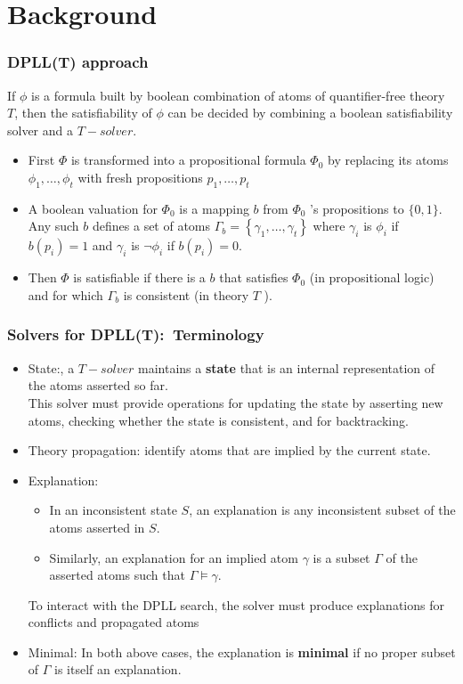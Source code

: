 \documentclass[aspectratio=169%
,serif,mathserif]{beamer}
\begin{document}
\section{Background}
\begin{frame}
	\frametitle{DPLL(T) approach}
	If $\phi$ is a formula built by boolean combination of atoms of quantifier-free theory $T$, then the
	satisfiability of $\phi$ can be decided by combining a boolean satisfiability solver and a $T-solver$.
	\begin{itemize}
		\item First $\Phi$ is transformed into a propositional formula $\Phi_{0}$ by replacing its atoms $\phi_{1}, \ldots, \phi_{t}$ with fresh propositions $p_{1}, \ldots, p_{t}$
		\item A boolean valuation for $\Phi_{0}$ is a mapping $b$ from $\Phi_{0}$ 's propositions to $\{0,1\}$. Any such $b$ defines a set of atoms $\Gamma_{b}=\left\{\gamma_{1}, \ldots, \gamma_{t}\right\}$ where $\gamma_{i}$ is $\phi_{i}$ if $b\left(p_{i}\right)=1$ and $\gamma_{i}$ is $\neg \phi_{i}$ if $b\left(p_{i}\right)=0$. 
		\item Then $\Phi$ is satisfiable if there is a $b$ that satisfies $\Phi_{0}$ (in propositional logic) and for which $\Gamma_{b}$ is consistent (in theory $T$ ).
	\end{itemize}
\end{frame}

\begin{frame}
	\frametitle{Solvers for DPLL(T):~Terminology}
	\begin{itemize}
		\item State:, a $T-solver$ maintains a \textbf{state} that is an internal representation of the
		atoms asserted so far. \\
		      This solver must provide operations for updating the state by asserting new
		atoms, checking whether the state is consistent, and for backtracking.
		\item Theory propagation: identify atoms that are implied by the current state.
		\item Explanation:
			\begin{itemize}
				\item In an inconsistent state $S$, an explanation is any inconsistent subset of the atoms asserted in $S$.
				\item Similarly, an explanation for an implied atom $\gamma$ is a subset $\Gamma$ of the asserted atoms such that $\Gamma \models \gamma$. 
			\end{itemize}
			To interact with the DPLL search, the solver must produce explanations for conflicts and propagated atoms
		\item Minimal: In both above cases, the explanation is \textbf{minimal} if no proper subset of $\Gamma$ is itself an explanation.
	
	\end{itemize}	

\end{frame}
\end{document}
